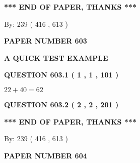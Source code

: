\documentclass[12pt]{article}
\begin{document}
   
   
\vspace{1.0in} 
{\textbf{\large{ *** END OF PAPER, THANKS *** }}} 
   
   
\hspace{1.0in} By: 
 239 ( 416 ,  613 )
   
   
   
   
\newpage 
\setcounter{page}{ 
   603001 } 
   
   
   
   
 {\textbf{ \Large{ PAPER NUMBER  603  }}}
   
   
\vspace{0.2in}
   
   
   
   
   
   
 \vspace{0.2in}
{\LARGE {\textbf{ A QUICK TEST EXAMPLE}}}
   
   
  
\vspace{0.2in}
  
{\textbf{\Large{QUESTION
603.1 
 ( 1 , 1 , 101 )
}}}
  
  
 
 

$ %
22 +  %
40=   %
62$
 
 
  
\vspace{0.2in}
  
{\textbf{\Large{QUESTION
603.2 
 ( 2 , 2 , 201 )
}}}
  
  
   
   
 \vspace{0.2in}
 
   
   
   
   
\vspace{1.0in} 
{\textbf{\large{ *** END OF PAPER, THANKS *** }}} 
   
   
\hspace{1.0in} By: 
 239 ( 416 ,  613 )
   
   
   
   
\newpage 
\setcounter{page}{ 
   604001 } 
   
   
   
   
 {\textbf{ \Large{ PAPER NUMBER  604  }}}
   
   
\vspace{0.2in}
   
\end{document}
